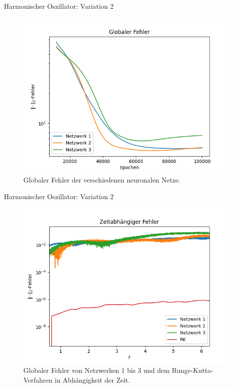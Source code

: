 \begin{frame}{Harmonischer Oszillator: Variation 2}
    \begin{figure}
        \centering
        \includegraphics[scale=0.5]{images/harmonicoscillator_plots/harmonicoscillatorML_error__layers_var_error}
        \caption{Globaler Fehler der verschiedenen neuronalen Netze.}
        \label{fig:harmonic-layers-variable-error}
    \end{figure}
\end{frame}

\begin{frame}{Harmonischer Oszillator: Variation 2}
    \begin{figure}
        \centering
        \includegraphics[scale=0.5]{images/harmonicoscillator_plots/harmonicoscillatorError_in_time_layers_var}
        \caption{Globaler Fehler von Netzwerken $1$ bis $3$ und dem Runge-Kutta-Verfahren in Abhängigkeit der Zeit.}
        \label{fig:harmonic-layers-variable-error-in-time}
    \end{figure}
\end{frame}

